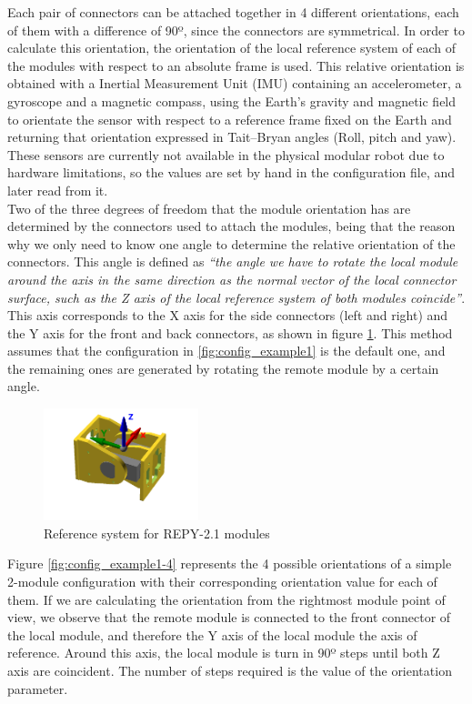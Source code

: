 Each pair of connectors can be attached together in 4 different orientations, each of them with a difference of 90º, since the connectors are symmetrical. In order to calculate this orientation, the orientation of the local reference system of each of the modules with respect to an absolute frame is used. This relative orientation is obtained with a Inertial Measurement Unit (IMU) containing an accelerometer, a gyroscope and a magnetic compass, using the Earth's gravity and magnetic field to orientate the sensor with respect to a reference frame fixed on the Earth and returning that orientation expressed in Tait–Bryan angles (Roll, pitch and yaw). These sensors are currently not available in the physical modular robot due to hardware limitations, so the values are set by hand in the configuration file, and later read from it.\\

Two of the three degrees of freedom that the module orientation has are determined by the connectors used to attach the modules, being that the reason why we only need to know one angle to determine the relative orientation of the connectors. This angle is defined as \emph{``the angle we have to rotate the local module around the axis in the same direction as the normal vector of the local connector surface, such as the Z axis of the local reference system of both modules coincide''}. This axis corresponds to the X axis for the side connectors (left and right) and the Y axis for the front and back connectors, as shown in figure \ref{fig:config_sysref}. This method assumes that the configuration in \ref{fig:config_example1} is the default one, and the remaining ones are generated by rotating the remote module by a certain angle.\\


\begin{figure}[h]
		\centering
        \includegraphics[width=0.4\textwidth]{images/Conf_sysref_module.png}
        \caption{Reference system for REPY-2.1 modules}
        \label{fig:config_sysref}
\end{figure}

Figure \ref{fig:config_example1-4} represents the 4 possible orientations of a simple 2-module configuration with their corresponding orientation value for each of them. If we are calculating the orientation from the rightmost module point of view, we observe that the remote module is connected to the front connector of the local module, and therefore the Y axis of the local module the axis of reference. Around this axis, the local module is turn in 90º steps until both Z axis are coincident. The number of steps required is the value of the orientation parameter.\\

